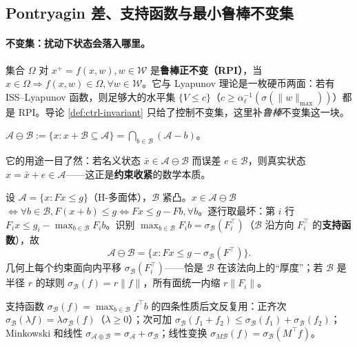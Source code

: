 \subsection{Pontryagin 差、支持函数与最小鲁棒不变集}
\label{sec:mpc-mrpi}
\paragraph{不变集：扰动下状态会落入哪里。}
集合 $\Omega$ 对 $x^+=f(x,w),w\in\mathcal W$ 是\textbf{鲁棒正不变（RPI）}，当 $x\in\Omega\Rightarrow f(x,w)\in\Omega,\forall w\in\mathcal W$。它与 Lyapunov 理论是一枚硬币两面：若有 ISS--Lyapunov 函数，则足够大的水平集 $\{V\le c\}$（$c\ge\alpha_\ell^{-1}(\sigma(\|w\|_{\max}))$）都是 RPI。导论 \cref{def:ctrl-invariant} 只给了控制不变集，这里补\emph{鲁棒}不变集这一块。

\begin{definition}
\label{def:mpc-pontryagin}
$\mathcal A\ominus\mathcal B:=\{x:x+\mathcal B\subseteq\mathcal A\}=\bigcap_{b\in\mathcal B}(\mathcal A-b)$。
\end{definition}

\noindent{}它的用途一目了然：若名义状态 $\bar x\in\mathcal A\ominus\mathcal B$ 而误差 $e\in\mathcal B$，则真实状态 $x=\bar x+e\in\mathcal A$——这正是\textbf{约束收紧}的数学本质。

\begin{derivation}
设 $\mathcal A=\{x:Fx\le g\}$（H-多面体），$\mathcal B$ 紧凸。$x\in\mathcal A\ominus\mathcal B$ $\iff\forall b\in\mathcal B,F(x+b)\le g\iff Fx\le g-Fb,\forall b$。逐行取最坏：第 $i$ 行 $F_ix\le g_i-\max_{b\in\mathcal B}F_ib$。识别 $\max_{b\in\mathcal B}F_ib=\sigma_{\mathcal B}(F_i^\top)$（$\mathcal B$ 沿方向 $F_i^\top$ 的\textbf{支持函数}），故
\begin{equation}
  \mathcal A\ominus\mathcal B=\{x:Fx\le g-\sigma_{\mathcal B}(F^\top)\}.
  \label{eq:mpc-pontryagin-H}
\end{equation}
几何上每个约束面向内平移 $\sigma_{\mathcal B}(F_i^\top)$——恰是 $\mathcal B$ 在该法向上的“厚度”；若 $\mathcal B$ 是半径 $r$ 的球则 $\sigma_{\mathcal B}(f)=r\|f\|$，所有面统一内缩 $r\|F_i\|$。
\end{derivation}

\noindent{}支持函数 $\sigma_{\mathcal B}(f)=\max_{b\in\mathcal B}f^\top b$ 的四条性质后文反复用：正齐次 $\sigma_{\mathcal B}(\lambda f)=\lambda\sigma_{\mathcal B}(f)$（$\lambda\ge0$）；次可加 $\sigma_{\mathcal B}(f_1+f_2)\le\sigma_{\mathcal B}(f_1)+\sigma_{\mathcal B}(f_2)$；Minkowski 和线性 $\sigma_{\mathcal A\oplus\mathcal B}=\sigma_{\mathcal A}+\sigma_{\mathcal B}$；线性变换 $\sigma_{M\mathcal B}(f)=\sigma_{\mathcal B}(M^\top f)$。

